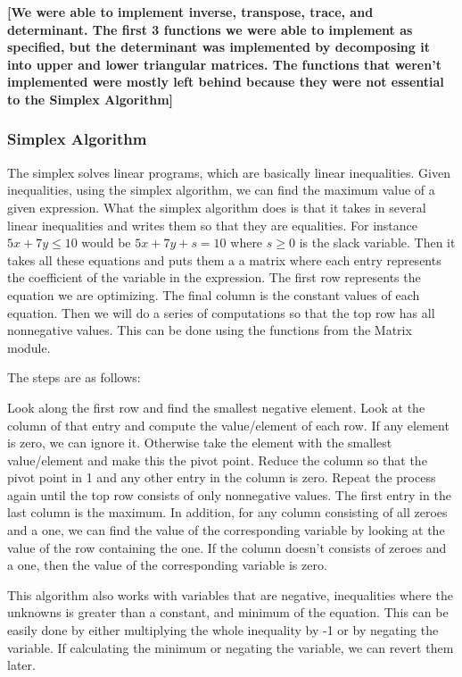 \documentclass[letterpaper,11pt]{article}
\newcommand{\annot}[1]{\textbf{\color{BrickRed} [#1]}}
\begin{document}
{\annot{We were able to implement inverse, transpose, trace, and determinant.
The first 3 functions we were able to implement as specified, but the
determinant was implemented by decomposing it into upper and lower triangular
matrices. The functions that weren't implemented were mostly left behind because
they were not essential to the Simplex Algorithm}}

\subsubsection{Simplex Algorithm}

The simplex solves linear programs, which are basically linear inequalities.
Given inequalities, using the simplex algorithm, we can find the maximum value
of a given expression. What the simplex algorithm does is that it takes in
several linear inequalities and writes them so that they are equalities. For
instance $5x + 7y \leq 10$ would be $5x + 7y + s = 10$ where $s \geq 0$ is the
slack variable. Then it takes all these equations and puts them a a matrix where
each entry represents the coefficient of the variable in the expression. The
first row represents the equation we are optimizing. The final column is the
constant values of each equation. Then we will do a series of computations so
that the top row has all nonnegative values. This can be done using the
functions from the Matrix module. 

The steps are as follows:

Look along the first row and find the smallest negative element. Look at the
column of that entry and compute the value/element of each row. If any element
is zero, we can ignore it. Otherwise take the element with the smallest
value/element and make this the pivot point. Reduce the column so that the pivot
point in 1 and any other entry in the column is zero. Repeat the process again
until the top row consists of only nonnegative values. The first entry in the
last column is the maximum. In addition, for any column consisting of all zeroes
and a one, we can find the value of the corresponding variable by looking at the
value of the row containing the one. If the column doesn’t consists of zeroes
and a one, then the value of the corresponding variable is zero. 

This algorithm also works with variables that are negative, inequalities where
the unknowns is greater than a constant, and minimum of the equation. This can
be easily done by either multiplying the whole inequality by -1 or by negating
the variable. If calculating the minimum or negating the variable, we can revert
them later.  
\end{document}
